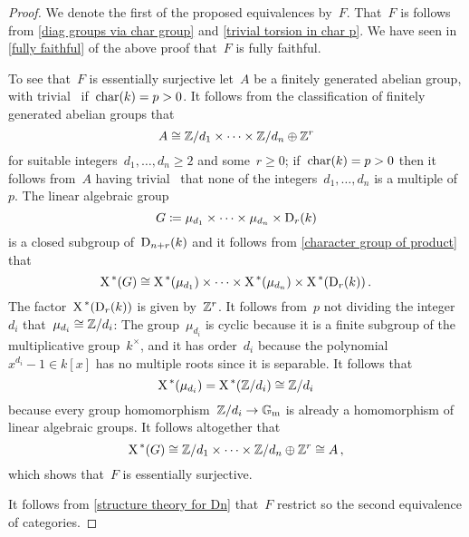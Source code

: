\begin{proof}
  We denote the first of the proposed equivalences by~$F$.
  That~$F$ is  follows from \cref{diag groups via char group} and \cref{trivial torsion in char p}.
  We have seen in \ref{fully faithful} of the above proof that~$F$ is fully faithful.
  
  To see that~$F$ is essentially surjective let~$A$ be a finitely generated abelian group, with trivial~ if~$\operatorname{char}(k) = p > 0$.
  It follows from the classification of finitely generated abelian groups that
  \[
          A
    \cong \mathbb{Z}/d_1 \times \dotsb \times \mathbb{Z}/d_n \oplus \mathbb{Z}^r
  \]
  for suitable integers~$d_1, \dotsc, d_n \geq 2$ and some~$r \geq 0$;
  if~$\operatorname{char}(k) = p > 0$ then it follows from~$A$ having trivial~ that none of the integers~$d_1, \dotsc, d_n$ is a multiple of~$p$.
  The linear algebraic group
  \[
              G
    \coloneqq  \mu_{d_1} \times \dotsb \times \mu_{d_n} \times \operatorname{D}_r(k)
  \]
  is a closed subgroup of~$\operatorname{D}_{n+r}(k)$ and it follows from \cref{character group of product} that
  \[
          \operatorname{X}^{\,*}(G)
    \cong \operatorname{X}^{\,*}(\mu_{d_1})
          \times \dotsb \times
          \operatorname{X}^{\,*}(\mu_{d_n})
          \times
          \operatorname{X}^{\,*}(\operatorname{D}_r(k)) \,.
  \]
  The factor~$\operatorname{X}^{\,*}(\operatorname{D}_r(k))$ is given by~$\mathbb{Z}^r$.
  It follows from~$p$ not dividing the integer~$d_i$ that~$\mu_{d_i} \cong \mathbb{Z}/d_i$:
  The group~$\mu_{d_i}$ is cyclic because it is a finite subgroup of the multiplicative group~$k^\times$, and it has order~$d_i$ because the polynomial~$x^{d_i} - 1 \in k[x]$ has no multiple roots since it is separable.
  It follows that
  \[
          \operatorname{X}^{\,*}(\mu_{d_i})
    =     \operatorname{X}^{\,*}(\mathbb{Z}/d_i)
    \cong \mathbb{Z}/d_i
  \]
  because every group homomorphism~$\mathbb{Z}/d_i \to \mathbb{G}_{\text{m}}$ is already a homomorphism of linear algebraic groups.
  It follows altogether that
  \[
          \operatorname{X}^{\,*}(G)
    \cong \mathbb{Z}/d_1 \times \dotsb \times \mathbb{Z}/d_n \oplus \mathbb{Z}^r
    \cong A \,,
  \]
  which shows that~$F$ is essentially surjective.
  
  It follows from \cref{structure theory for Dn} that~$F$ restrict so the second equivalence of categories.
\end{proof}




